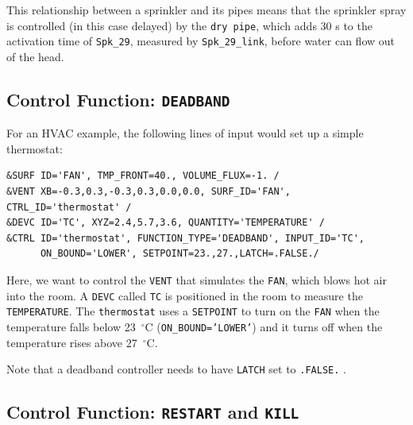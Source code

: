 \documentclass[11pt]{book}
\newcommand{\ct}{\tt\small}
\begin{document}
\noindent
This relationship between a sprinkler and its pipes means that the sprinkler spray is controlled (in this case delayed) by the
{\ct dry pipe}, which adds 30 s to the activation time of {\ct Spk\_29}, measured by  {\ct Spk\_29\_link},
before water can flow out of the head. %





\subsection{Control Function: \texorpdfstring{{\tt DEADBAND}}{DEADBAND}}

For an HVAC example, the following lines of input would set up a simple thermostat:

\footnotesize
\begin{verbatim}
&SURF ID='FAN', TMP_FRONT=40., VOLUME_FLUX=-1. /
&VENT XB=-0.3,0.3,-0.3,0.3,0.0,0.0, SURF_ID='FAN', CTRL_ID='thermostat' /
&DEVC ID='TC', XYZ=2.4,5.7,3.6, QUANTITY='TEMPERATURE' /
&CTRL ID='thermostat', FUNCTION_TYPE='DEADBAND', INPUT_ID='TC',
      ON_BOUND='LOWER', SETPOINT=23.,27.,LATCH=.FALSE./
\end{verbatim} \normalsize

\noindent
Here, we want to control the {\ct VENT} that simulates the {\ct FAN}, which blows hot air
into the room. A {\ct DEVC} called {\ct TC} is positioned in the room to measure the {\ct TEMPERATURE}.
The {\ct thermostat} uses a {\ct SETPOINT} to turn on the
{\ct FAN} when the temperature falls below 23~$^\circ$C ({\ct ON\_BOUND='LOWER'}) 
and it turns off when the temperature rises above 27~$^\circ$C.

\begin{warning}
Note that a deadband controller needs to have {\ct LATCH} set to {\ct .FALSE.} .
\end{warning}

\subsection{Control Function: \texorpdfstring{{\tt RESTART} and {\tt KILL}} {RESTARTKILL} }
\end{document}
